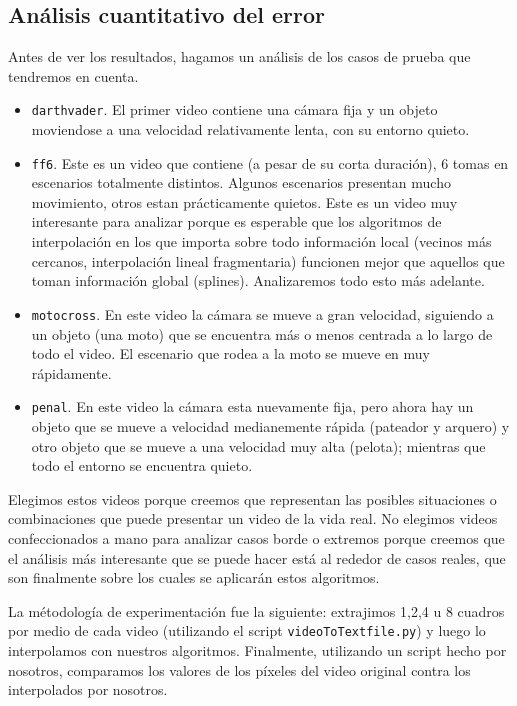 \subsection{Análisis cuantitativo del error}

Antes de ver los resultados, hagamos un análisis de los casos de prueba que tendremos en cuenta.

\begin{itemize}
    \item \texttt{darthvader}. El primer video contiene una cámara fija y un objeto moviendose a una velocidad relativamente lenta, con su entorno quieto. 
    \item \texttt{ff6}. Este es un video que contiene (a pesar de su corta duración), 6 tomas en escenarios totalmente distintos. Algunos escenarios presentan mucho movimiento, otros estan prácticamente quietos. Este es un video muy interesante para analizar porque es esperable que los algoritmos de interpolación en los que importa sobre todo información local (vecinos más cercanos, interpolación lineal fragmentaria) funcionen mejor que aquellos que toman información global (splines). Analizaremos todo esto más adelante. 
    \item \texttt{motocross}. En este video la cámara se mueve a gran velocidad, siguiendo a un objeto (una moto) que se encuentra más o menos centrada a lo largo de todo el video. El escenario que rodea a la moto se mueve en muy rápidamente.
    \item \texttt{penal}. En este video la cámara esta nuevamente fija, pero ahora hay un objeto que se mueve a velocidad medianemente rápida (pateador y arquero) y otro objeto que se mueve a una velocidad muy alta (pelota); mientras que todo el entorno se encuentra quieto. 
\end{itemize}

Elegimos estos videos porque creemos que representan las posibles situaciones o combinaciones que puede presentar un video de la vida real. No elegimos videos confeccionados a mano para analizar casos borde o extremos porque creemos que el análisis más interesante que se puede hacer está al rededor de casos reales, que son finalmente sobre los cuales se aplicarán estos algoritmos.

La métodología de experimentación fue la siguiente: extrajimos 1,2,4 u 8 cuadros por medio de cada video (utilizando el script \texttt{videoToTextfile.py}) y luego lo interpolamos con nuestros algoritmos. Finalmente, utilizando un script hecho por nosotros, comparamos los valores de los píxeles del video original contra los interpolados por nosotros. 

